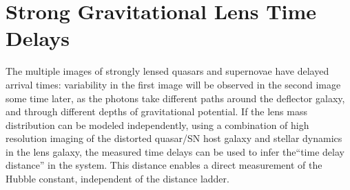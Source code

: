 %
%
%
%
%
%
%

\section{ Strong Gravitational Lens Time Delays }
\label{sec:lenstimedelays}




The multiple images of strongly lensed quasars and supernovae have
delayed arrival times: variability in the first image will be observed
in the second image some time later, as the photons take different
paths around the deflector galaxy, and through different depths of
gravitational potential. If the lens mass distribution can be modeled
independently, using a combination of high resolution imaging of the
distorted quasar/SN host galaxy and stellar dynamics in the lens
galaxy, the measured time delays can be used to infer the``time delay
distance'' in the system. This distance enables a direct measurement
of the Hubble constant, independent of the distance ladder.

